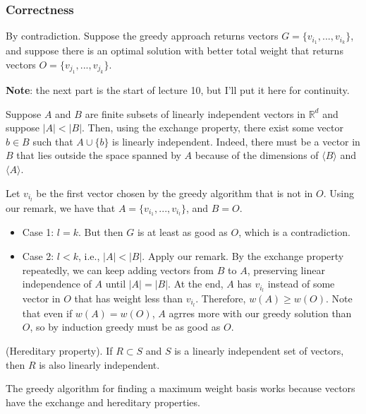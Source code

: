 \subsubsection{Correctness}

By contradiction. Suppose the greedy approach returns vectors $G = 
\{v_{i_1}, ..., v_{i_k}\}$,
and suppose there is an optimal solution with better total weight that
returns vectors
$O = \{v_{j_1}, ..., v_{j_k}\}$.

\textbf{Note}: the next part is the start of lecture 10, but I'll put it 
here for continuity.

\begin{remark}
    Suppose $A$ and $B$ are finite subsets of linearly independent
    vectors in $\mathbb{R}^d$ and suppose $|A| < |B|$. Then, using
    the exchange property, there exist some vector $b \in B$ such that
    $A \cup \{b\}$ is linearly independent. Indeed, there must be a
    vector in $B$ that lies outside the space spanned by $A$ because
    of the dimensions of $\langle B \rangle$ and $\langle A \rangle$.
\end{remark}

Let $v_{i_l}$ be the first vector chosen by the greedy algorithm that
is not in $O$. Using our remark, we have that 
$A = \{v_{i_1}, ..., v_{i_l}\}$, and $B = O$.

\begin{itemize}
    \item Case 1: $l = k$. But then $G$ is at least as good
    as $O$, which is a contradiction.
    \item Case 2: $ l < k$, i.e., $|A| < |B|$. Apply our remark.
    By the exchange property repeatedly, we can keep adding vectors
    from $B$ to $A$, preserving linear independence of $A$ until
    $|A| = |B|$. At the end, $A$ has $v_{i_l}$ instead of some
    vector in $O$ that has weight less than $v_{i_l}$. Therefore,
    $w(A) \geq w(O)$. Note that even if $w(A) = w(O)$, $A$ agrres more
    with our greedy solution than $O$, so by induction greedy must be
    as good as $O$.
\end{itemize}

\begin{definition}
    (Hereditary property). If $R \subset S$ and $S$ is a linearly
    independent set of vectors, then $R$ is also linearly independent.
\end{definition}

The greedy algorithm for finding a maximum weight basis works because
vectors have the exchange and hereditary properties.





